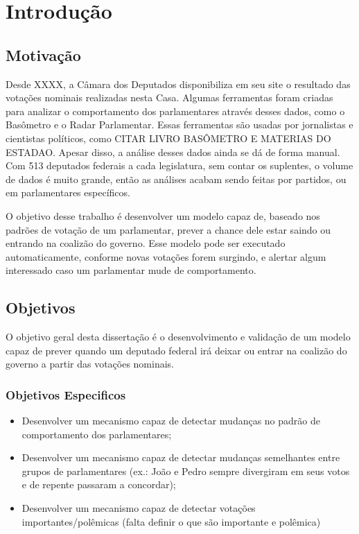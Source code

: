 \chapter{Introdução} \label{intro}

\section{Motivação}\label{sec:motiva}

Desde XXXX, a Câmara dos Deputados disponibiliza em seu site o resultado das
votações nominais realizadas nesta Casa. Algumas ferramentas foram criadas para
analizar o comportamento dos parlamentares através desses dados, como o
Basômetro e o Radar Parlamentar. Essas ferramentas são usadas por jornalistas e
cientistas políticos, como CITAR LIVRO BASÔMETRO E MATERIAS DO ESTADAO. Apesar
disso, a análise desses dados ainda se dá de forma manual. Com 513 deputados
federais a cada legislatura, sem contar os suplentes, o volume de dados é muito
grande, então as análises acabam sendo feitas por partidos, ou em parlamentares
específicos.

O objetivo desse trabalho é desenvolver um modelo capaz de, baseado nos padrões
de votação de um parlamentar, prever a chance dele estar saindo ou entrando na
coalizão do governo. Esse modelo pode ser executado automaticamente, conforme
novas votações forem surgindo, e alertar algum interessado caso um parlamentar
mude de comportamento.

\section{Objetivos}

O objetivo geral desta dissertação é o desenvolvimento e validação de um modelo
capaz de prever quando um deputado federal irá deixar ou entrar na coalizão do
governo a partir das votações nominais.

\subsection{Objetivos Especificos}

\begin{itemize}
\item Desenvolver um mecanismo capaz de detectar mudanças no padrão de comportamento dos parlamentares;
\item Desenvolver um mecanismo capaz de detectar mudanças semelhantes entre grupos de parlamentares (ex.: João e Pedro sempre divergiram em seus votos e de repente passaram a concordar);
\item Desenvolver um mecanismo capaz de detectar votações importantes/polêmicas (falta definir o que são importante e polêmica)
\end{itemize}

